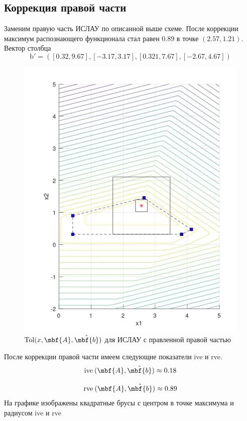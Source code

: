 \documentclass[12pt,a4paper]{article}
\begin{document}
    \subsection{Коррекция правой части}
    Заменим правую часть ИСЛАУ по описанной выше схеме. После коррекции максимум распознающего функционала стал равен $0.89$ в точке $(2.57,1.21)$.
    Вектор столбца
     $$
        \mathrm{b'} = ([0.32, 9.67],[−3.17, 3.17],[0.321,7.67],[−2.67, 4.67])
    $$
    \begin{figure}[H]
        \centering
        \includegraphics[width=16cm]{tol_right.png}
        \caption{$\mathrm{Tol}(x,\mbf{A}, \hat{\mbf{b}})$ для ИСЛАУ с правленной правой частью}
        \label{fig:btol}
    \end{figure}
    
    После коррекции правой части имеем следующие показатели ive и rve.
    $$
        \mathrm{ive}\:(\mbf{A}, \hat{\mbf{b}})\approx0.18
    $$
    
    $$
        \mathrm{rve}\:(\mbf{A}, \hat{\mbf{b}})\approx0.89
    $$
    На графике изображены квадратные брусы
с центром в точке максимума и радиусом ive и rve
    
\end{document}
